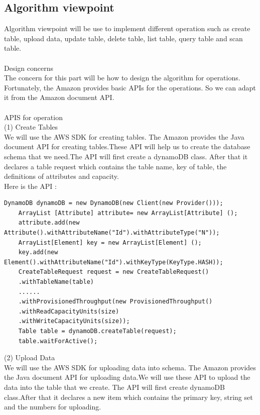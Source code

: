     \subsection{Algorithm viewpoint}
    Algorithm viewpoint will be use to implement different operation such as create table, upload data, update table, delete table, list table, query table and scan table.\\
\\
    Design concerns\\
    The concern for this part will be how to design the algorithm for operations. Fortunately, the Amazon provides basic APIs for the operations. So we can adapt it from the Amazon document API.\\
\\
    APIS for operation\\
    (1) Create Tables\\
    We will use the AWS SDK for creating tables. The Amazon provides the Java document API for creating tables.These API will help us to create the database schema that we need.The API will first create a dynamoDB class. After that it declares a table request which contains the table name, key of table, the definitions of attributes and capacity.\\
    Here is the API\cite{w1} :\\
    \begin{lstlisting}[caption=API for create tables]
	DynamoDB dynamoDB = new DynamoDB(new Client(new Provider()));
	ArrayList [Attribute] attribute= new ArrayList[Attribute] ();
	attribute.add(new Attribute().withAttributeName("Id").withAttributeType("N"));
  	ArrayList[Element] key = new ArrayList[Element] ();
 	key.add(new  Element().withAttributeName("Id").withKeyType(KeyType.HASH));
	CreateTableRequest request = new CreateTableRequest()
	.withTableName(table)
	......
	.withProvisionedThroughput(new ProvisionedThroughput()
	.withReadCapacityUnits(size)
	.withWriteCapacityUnits(size));
	Table table = dynamoDB.createTable(request);
	table.waitForActive();
  \end{lstlisting}
    (2) Upload Data\\
    We will use the AWS SDK for uploading data into schema. The Amazon provides the Java document API for uploading data.We will use these API to upload the data into the table that we create. The API will first create dynamoDB class.After that it declares a new item which contains the primary key, string set and the numbers for uploading.\\
